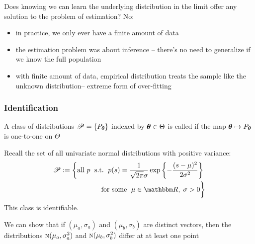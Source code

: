 \begin{frame}
    
    \vspace{2em}
    Does knowing we can learn the underlying distribution in the limit offer
    any solution to the problem of estimation? No:

    \begin{itemize}
        \item in practice, we only
    ever have a finite amount of data
        \item the estimation problem was about inference -- there's no
                need to generalize if we know the full population
        \item with finite amount of data, empirical
        distribution treats
        the sample like the unknown distribution-- extreme form of
        over-fitting
    \end{itemize}
    
\end{frame}


\begin{frame}\frametitle{Identification}
    A class of distributions $\mathscr P = \{P_{{\boldsymbol \theta}}\}$ indexed by ${\boldsymbol \theta} \in
    \Theta$ is called  if the map ${\boldsymbol \theta} \mapsto
    P_{{\boldsymbol \theta}}$ is one-to-one
    on $\Theta$

\end{frame}

\begin{frame}

    \vspace{2em}
    \Eg
    Recall the set of 
    all univariate normal distributions with positive variance:
    \begin{align*}
        \pP := 
        \bigg\{
        \text{all } p \; \st \;
        p(s) = \frac{1}{\sqrt{2 \pi} \sigma}
       \exp \left\{ - \frac{(s - \mu)^2}{2\sigma^2} \right\}
       \; \\ \text{ for some }
       \; \mu \in \RR, \; \sigma > 0
       \bigg\}
    \end{align*}
    This class is identifiable.
    
    \vspace{.7em}
    We can show that if $(\mu_a, \sigma_a)$ and $(\mu_b,
    \sigma_b)$ are distinct vectors, then the distributions $\textrm{\sc n}(\mu_a,
    \sigma^2_a)$ and $\textrm{\sc n}(\mu_b, \sigma^2_b)$ differ at at least one point
    
\end{frame}

